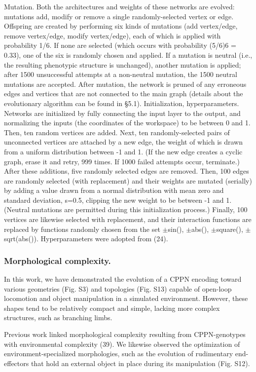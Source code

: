 Mutation.  Both the architectures and weights of these networks are evolved: mutations add, modify or remove a single randomly-selected vertex or edge. Offspring are created by performing six kinds of mutations (add vertex/edge, remove vertex/edge, modify vertex/edge), each of which is applied with probability 1/6. If none are selected (which occurs with probability (5/6)6 = 0.33), one of the six is randomly chosen and applied. If a mutation is neutral (i.e., the resulting phenotypic structure is unchanged), another mutation is applied; after 1500 unsuccessful attempts at a non-neutral mutation, the 1500 neutral mutations are accepted. After mutation, the network is pruned of any erroneous edges and vertices that are not connected to the main graph (details about the evolutionary algorithm can be found in §5.1).
Initialization, hyperparameters.  Networks are initialized by fully connecting the input layer to the output, and normalizing the inputs (the coordinates of the workspace) to be between 0 and 1. Then, ten random vertices are added. Next, ten randomly-selected pairs of unconnected vertices are attached by a new edge, the weight of which is drawn from a uniform distribution between -1 and 1. (If the new edge creates a cyclic graph, erase it and retry, 999 times. If 1000 failed attempts occur, terminate.) After these additions, five randomly selected edges are removed. Then, 100 edges are randomly selected (with replacement) and their weights are mutated (serially) by adding a value drawn from a normal distribution with mean zero and standard deviation, s=0.5, clipping the new weight to be between -1 and 1. (Neutral mutations are permitted during this initialization process.) Finally, 100 vertices are likewise selected with replacement, and their interaction functions are replaced by functions randomly chosen from the set {{$\pm$}sin(), {$\pm$}abs(), {$\pm$}square(), {$\pm$}sqrt(abs())}. Hyperparameters were adopted from (24).

\subsubsection*{Morphological complexity.}  In this work, we have demonstrated the evolution of a CPPN encoding toward various geometries (Fig. S3) and topologies (Fig. S13) capable of open-loop locomotion and object manipulation in a simulated environment. However, these shapes tend to be relatively compact and simple, lacking more complex structures, such as branching limbs.

Previous work linked morphological complexity resulting from CPPN-genotypes with environmental complexity (39). We likewise observed the optimization of environment-specialized morphologies, such as the evolution of rudimentary end-effectors that hold an external object in place during its manipulation (Fig. S12).

